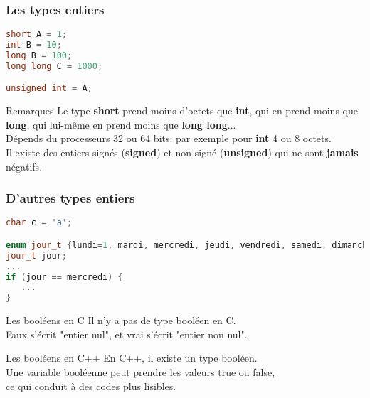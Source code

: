 \documentclass{beamer}
\begin{document}
\begin{frame}[fragile=singleslide,shrink=20]
\frametitle {Les types entiers}
\begin{lstlisting}[language=c++]
short A = 1;
int B = 10;
long B = 100;
long long C = 1000;

unsigned int = A;

\end{lstlisting}
\begin{block}{Remarques}
Le type \textbf{short} prend moins d'octets que \textbf{int}, qui en prend moins que \textbf{long}, qui lui-même en prend moins que \textbf{long long}... \\
Dépends du processeurs 32 ou 64 bits: par exemple pour \textbf{int} 4 ou 8 octets.\\
Il existe des entiers signés (\textbf{signed}) et non signé (\textbf{unsigned}) qui ne sont \textbf{jamais} négatifs.
\end{block}
\end{frame}

\begin{frame}[fragile=singleslide,shrink=20]
\frametitle {D'autres types entiers}
\begin{lstlisting}[language=c++]
char c = 'a';

enum jour_t {lundi=1, mardi, mercredi, jeudi, vendredi, samedi, dimanche};
jour_t jour;
...
if (jour == mercredi) {
   ...
}
\end{lstlisting}
\begin{block}{Les booléens en C}
Il n'y a pas de type booléen en C. \\
Faux s'écrit "entier nul", et vrai s'écrit "entier non nul".
\end{block}
\begin{block}{Les booléens en C++}
En C++, il existe un type booléen. \\
Une variable booléenne peut prendre les valeurs true ou false, \\
ce qui conduit à des codes plus lisibles.
\end{block}
\end{frame}
\end{document}
